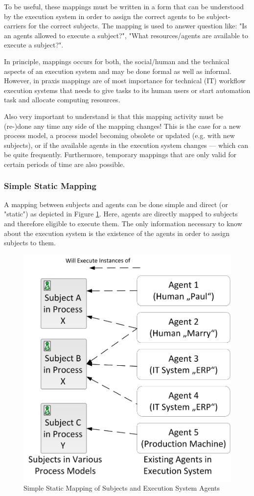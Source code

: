 To be useful, these mappings must be written in a form that can be understood by the execution system in order to assign the correct agents to be subject-carriers for the correct subjects. The mapping is used to answer question like: "Is an agents allowed to execute a subject?", "What resources/agents are available to execute a subject?". 

In principle, mappings occurs for both, the social/human and the technical aspects of an execution system and may be done formal as well as informal. However, in praxis mappings are of most importance for technical (IT) workflow execution systems that needs to give tasks to its human users or start automation task and allocate computing resources. 

Also very important to understand is that this mapping activity must be (re-)done any time any side of the mapping changes! This is the case for a new process model, a process model becoming obsolete or updated (e.g. with new subjects), or if the available agents in the execution system changes --- which can be quite frequently. Furthermore, temporary mappings that are only valid for certain periods of time are also possible.


\subsubsection{Simple Static Mapping}

A mapping between subjects and agents can be done simple and direct (or "static") as depicted in Figure \ref{fig:simpleStaticMapping}. Here, agents are directly mapped to subjects and therefore eligible to execute them. The only information necessary to know about the execution system is the existence of the agents in order to assign subjects to them.

\begin{figure}[htbp]
	\centering
	\includegraphics[width=0.45\linewidth]{Figures/Implementation/SimpleMapping.png}
	\caption[Simple Static Mapping of Subjects and Execution System Agents]{Simple Static Mapping of Subjects and Execution System Agents}
	\label{fig:simpleStaticMapping}
\end{figure}

